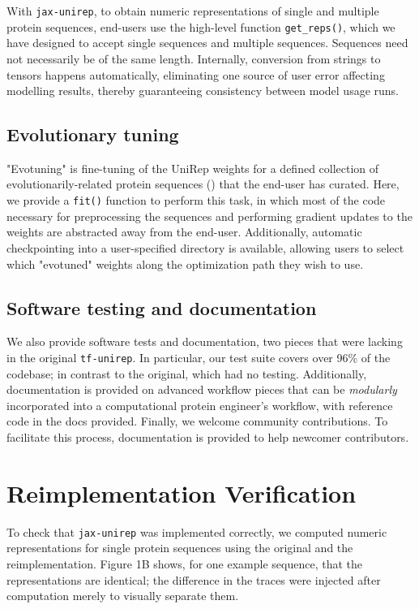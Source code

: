\documentclass[twoside,11pt]{article}
\begin{document}
With \verb|jax-unirep|,
to obtain numeric representations of single and multiple protein sequences,
end-users use the high-level function \verb|get_reps()|,
which we have designed to accept single sequences and multiple sequences.
Sequences need not necessarily be of the same length.
Internally, conversion from strings to tensors happens automatically,
eliminating one source of user error affecting modelling results,
thereby guaranteeing consistency between model usage runs.

\subsection{Evolutionary tuning}

"Evotuning" is fine-tuning of the UniRep weights
for a defined collection
of evolutionarily-related protein sequences (\cite{alley2019unified})
that the end-user has curated.
Here, we provide a \verb|fit()| function to perform this task,
in which most of the code necessary for preprocessing the sequences
and performing gradient updates to the weights
are abstracted away from the end-user.
Additionally, automatic checkpointing
into a user-specified directory is available,
allowing users to select
which "evotuned" weights along the optimization path
they wish to use.

\subsection{Software testing and documentation}

We also provide software tests and documentation,
two pieces that were lacking in the original \verb|tf-unirep|.
In particular, our test suite covers over 96\% of the codebase;
in contrast to the original, which had no testing.
Additionally, documentation is provided on advanced workflow pieces
that can be \textit{modularly} incorporated
into a computational protein engineer's workflow,
with reference code in the docs provided.
Finally, we welcome community contributions.
To facilitate this process,
documentation is provided to help newcomer contributors.

\section{Reimplementation Verification}

To check that \verb|jax-unirep| was implemented correctly,
we computed numeric representations for single protein sequences
using the original and the reimplementation.
Figure 1B\vphantom{\ref{fig:fig01}} shows, for one example sequence,
that the representations are identical;
the difference in the traces were injected after computation
merely to visually separate them.
\end{document}
